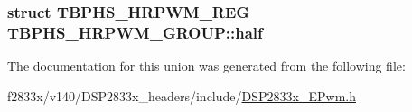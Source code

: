 \subsubsection[{half}]{\setlength{\rightskip}{0pt plus 5cm}struct {\bf T\+B\+P\+H\+S\+\_\+\+H\+R\+P\+W\+M\+\_\+\+R\+E\+G} T\+B\+P\+H\+S\+\_\+\+H\+R\+P\+W\+M\+\_\+\+G\+R\+O\+U\+P\+::half}\label{union_t_b_p_h_s___h_r_p_w_m___g_r_o_u_p_a4695304afa6ccac89d6c62f41d6a359b}


The documentation for this union was generated from the following file\+:\begin{DoxyCompactItemize}
\item 
f2833x/v140/\+D\+S\+P2833x\+\_\+headers/include/\hyperlink{_d_s_p2833x___e_pwm_8h}{D\+S\+P2833x\+\_\+\+E\+Pwm.\+h}\end{DoxyCompactItemize}
